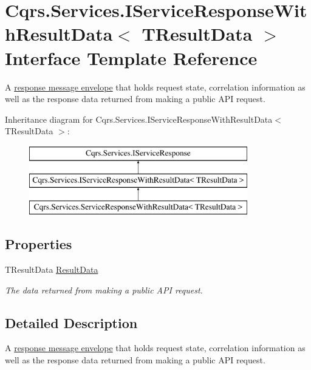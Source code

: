 \hypertarget{interfaceCqrs_1_1Services_1_1IServiceResponseWithResultData}{}\section{Cqrs.\+Services.\+I\+Service\+Response\+With\+Result\+Data$<$ T\+Result\+Data $>$ Interface Template Reference}
\label{interfaceCqrs_1_1Services_1_1IServiceResponseWithResultData}


A \hyperlink{interfaceCqrs_1_1Services_1_1IServiceResponse}{response message envelope} that holds request state, correlation information as well as the response data returned from making a public A\+PI request.  


Inheritance diagram for Cqrs.\+Services.\+I\+Service\+Response\+With\+Result\+Data$<$ T\+Result\+Data $>$\+:\begin{figure}[H]
\begin{center}
\leavevmode
\includegraphics[height=3.000000cm]{interfaceCqrs_1_1Services_1_1IServiceResponseWithResultData}
\end{center}
\end{figure}
\subsection*{Properties}
\begin{DoxyCompactItemize}
\item 
T\+Result\+Data \hyperlink{interfaceCqrs_1_1Services_1_1IServiceResponseWithResultData_a9cca2c2341cc95f3c55fb2058c240dd1_a9cca2c2341cc95f3c55fb2058c240dd1}{Result\+Data}
\begin{DoxyCompactList}\small\item\em The data returned from making a public A\+PI request. \end{DoxyCompactList}\end{DoxyCompactItemize}


\subsection{Detailed Description}
A \hyperlink{interfaceCqrs_1_1Services_1_1IServiceResponse}{response message envelope} that holds request state, correlation information as well as the response data returned from making a public A\+PI request. 


